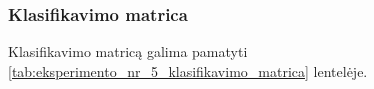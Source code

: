 \subsubsection{Klasifikavimo matrica}
\label{subsubsec:eksperimentas_nr_5_klasifikavimo_matrica}

Klasifikavimo matricą galima pamatyti \ref{tab:eksperimento_nr_5_klasifikavimo_matrica} lentelėje.

